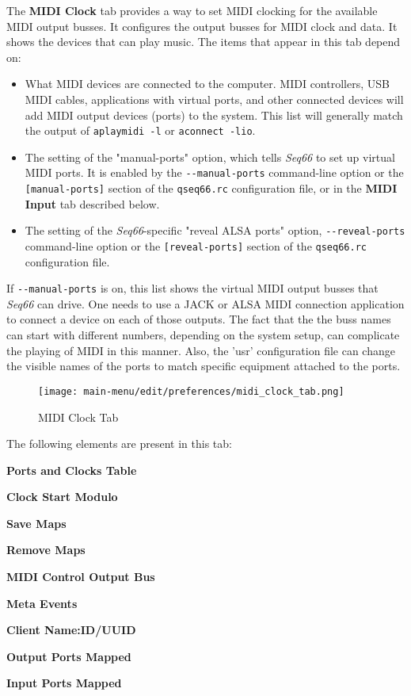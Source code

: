    The \textbf{MIDI Clock} tab provides a way to set MIDI clocking for
   the available MIDI output busses.
   It configures the output busses for MIDI clock and data.
   It shows the devices that can play music.
   The items that appear in this tab depend on:

   \begin{itemize}
      \item What MIDI devices are connected to the computer.
         MIDI controllers, USB MIDI cables, applications with virtual
         ports, and other connected devices will add MIDI
         output devices (ports) to the system.
         This list will generally match the output of \texttt{aplaymidi -l}
         or \texttt{aconnect -lio}.
      \item The setting of the "manual-ports" option, which tells
         \textsl{Seq66} to set up virtual MIDI ports.
         It is enabled by the
         \texttt{-{}-manual-ports} command-line option or the
         \texttt{[manual-ports]} section of the
         \texttt{qseq66.rc} configuration file,
         or in the \textbf{MIDI Input} tab described below.
      \item The setting of the \textsl{Seq66}-specific
         "reveal ALSA ports" option,
         \texttt{-{}-reveal-ports} command-line option or the
         \texttt{[reveal-ports]} section of the
         \texttt{qseq66.rc} configuration file.
   \end{itemize}

   If \texttt{-{}-manual-ports} is on, this list shows the virtual
   MIDI output busses that \textsl{Seq66} can drive.
   One needs to use a JACK or ALSA MIDI
   connection application to connect a device on each of those outputs.
   The fact that the the buss names can
   start with different numbers, depending on the system setup, can complicate
   the playing of MIDI in this manner.  Also, the 'usr' configuration file can
   change the visible names of the ports to match specific equipment attached
   to the ports.

\begin{figure}[H]
   \centering 
   \texttt{[image: main-menu/edit/preferences/midi\_clock\_tab.png]}
   \caption{MIDI Clock Tab}
   \label{fig:midi_clock_tab}
\end{figure}

   The following elements are present in this tab:

   \begin{enumber}
      \item \textbf{Ports and Clocks Table}
      \item \textbf{Clock Start Modulo}
      \item \textbf{Save Maps}
      \item \textbf{Remove Maps}
      \item \textbf{MIDI Control Output Bus}
      \item \textbf{Meta Events}
      \item \textbf{Client Name:ID/UUID}
      \item \textbf{Output Ports Mapped}
      \item \textbf{Input Ports Mapped}
   \end{enumber}

